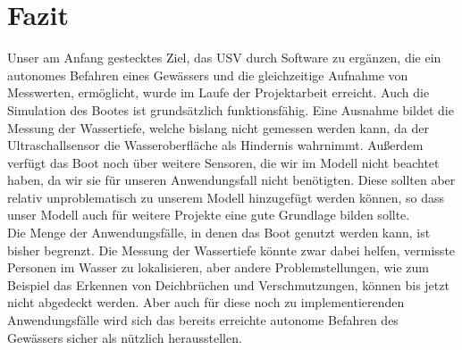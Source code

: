 \documentclass[11pt]{article}
\begin{document}
\section{Fazit} \label{fazit}
Unser am Anfang gestecktes Ziel, das USV durch Software zu ergänzen, die ein autonomes Befahren eines Gewässers und die gleichzeitige Aufnahme von Messwerten, ermöglicht, wurde im Laufe der Projektarbeit erreicht. Auch die Simulation des Bootes ist grundsätzlich funktionsfähig. Eine Ausnahme bildet die Messung der Wassertiefe, welche bislang nicht gemessen werden kann, da der Ultraschallsensor die Wasseroberfläche als Hindernis wahrnimmt. Außerdem verfügt das Boot noch über weitere Sensoren, die wir im Modell nicht beachtet haben, da wir sie für unseren Anwendungsfall nicht benötigten. Diese sollten aber relativ unproblematisch zu unserem Modell hinzugefügt werden können, so dass unser Modell auch für weitere Projekte eine gute Grundlage bilden sollte.\\
Die Menge der Anwendungsfälle, in denen das Boot genutzt werden kann, ist bisher begrenzt. Die Messung der Wassertiefe könnte zwar dabei helfen, vermisste Personen im Wasser zu lokalisieren, aber andere Problemstellungen, wie zum Beispiel das Erkennen von Deichbrüchen und Verschmutzungen, können bis jetzt nicht abgedeckt werden. Aber auch für diese noch zu implementierenden Anwendungsfälle wird sich das bereits erreichte autonome Befahren des Gewässers sicher als nützlich herausstellen.

{}

\end{document}
